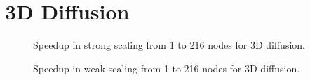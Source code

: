 \section{3D Diffusion}
\begin{figure}[]
	\begin{center}
		
	\end{center}
	\caption{Speedup in strong scaling from 1 to 216 nodes for 3D diffusion.}
	\label{fig:scaling5}
\end{figure}
\begin{figure}[]
	\begin{center}
		
	\end{center}
	\caption{Speedup in weak scaling from 1 to 216 nodes for 3D diffusion.}
	\label{fig:scaling5}
\end{figure}
